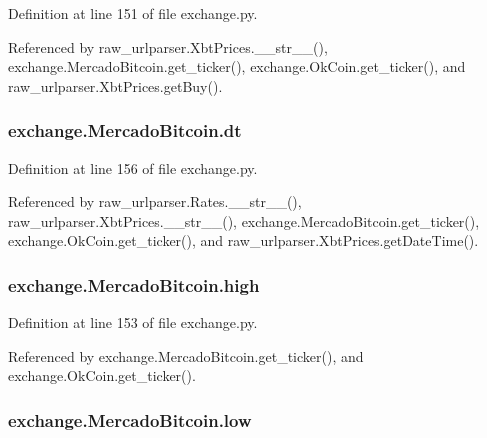 Definition at line 151 of file exchange.\-py.



Referenced by raw\-\_\-urlparser.\-Xbt\-Prices.\-\_\-\-\_\-str\-\_\-\-\_\-(), exchange.\-Mercado\-Bitcoin.\-get\-\_\-ticker(), exchange.\-Ok\-Coin.\-get\-\_\-ticker(), and raw\-\_\-urlparser.\-Xbt\-Prices.\-get\-Buy().

\hypertarget{classexchange_1_1_mercado_bitcoin_aeee983ba4f72223a11fb914d22902c56}{
\subsubsection[{dt}]{\setlength{\rightskip}{0pt plus 5cm}exchange.\-Mercado\-Bitcoin.\-dt}}\label{classexchange_1_1_mercado_bitcoin_aeee983ba4f72223a11fb914d22902c56}


Definition at line 156 of file exchange.\-py.



Referenced by raw\-\_\-urlparser.\-Rates.\-\_\-\-\_\-str\-\_\-\-\_\-(), raw\-\_\-urlparser.\-Xbt\-Prices.\-\_\-\-\_\-str\-\_\-\-\_\-(), exchange.\-Mercado\-Bitcoin.\-get\-\_\-ticker(), exchange.\-Ok\-Coin.\-get\-\_\-ticker(), and raw\-\_\-urlparser.\-Xbt\-Prices.\-get\-Date\-Time().

\hypertarget{classexchange_1_1_mercado_bitcoin_a0b9c2d465601a48e3b8838354e931c39}{
\subsubsection[{high}]{\setlength{\rightskip}{0pt plus 5cm}exchange.\-Mercado\-Bitcoin.\-high}}\label{classexchange_1_1_mercado_bitcoin_a0b9c2d465601a48e3b8838354e931c39}


Definition at line 153 of file exchange.\-py.



Referenced by exchange.\-Mercado\-Bitcoin.\-get\-\_\-ticker(), and exchange.\-Ok\-Coin.\-get\-\_\-ticker().

\hypertarget{classexchange_1_1_mercado_bitcoin_aaa3aae824bfc5ba3b7dc5252e9554713}{
\subsubsection[{low}]{\setlength{\rightskip}{0pt plus 5cm}exchange.\-Mercado\-Bitcoin.\-low}}\label{classexchange_1_1_mercado_bitcoin_aaa3aae824bfc5ba3b7dc5252e9554713}


